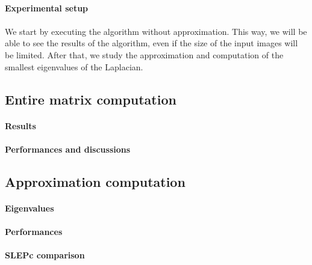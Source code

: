 \paragraph{Experimental setup}


\paragraph{}
We start by executing the algorithm without approximation.
This way, we will be able to see the results of the algorithm, even if the size of the input images will be limited.
After that, we study the approximation and computation of the smallest eigenvalues of the Laplacian.

\subsection{Entire matrix computation}

\paragraph{Results}


\paragraph{Performances and discussions}


\subsection{Approximation computation}

\paragraph{Eigenvalues}


\paragraph{Performances}


\paragraph{SLEPc comparison}

